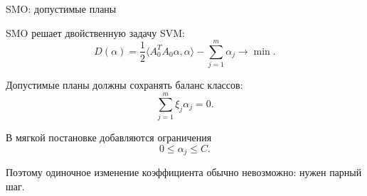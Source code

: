 \SPBGContentSlide
  {SMO: допустимые планы}
  {%
    \FormulaBody
    SMO решает двойственную задачу SVM:
    \[
      D(\alpha)=
      \frac12\langle A_0^TA_0\alpha,\alpha\rangle-
      \sum_{j=1}^{m}\alpha_j
      \to\min.
    \]

    Допустимые планы должны сохранять баланс классов:
    \[
      \sum_{j=1}^{m}\xi_j\alpha_j=0.
    \]

    В мягкой постановке добавляются ограничения
    \[
      0\leq\alpha_j\leq C.
    \]

    \Body
    Поэтому одиночное изменение коэффициента обычно невозможно:
    нужен парный шаг.
  }

